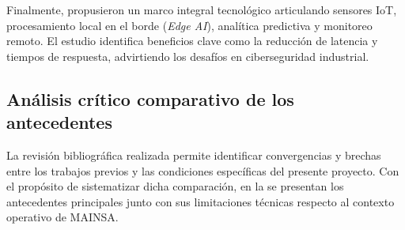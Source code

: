 Finalmente, \cite{hamasha2025} propusieron un marco integral tecnológico articulando sensores IoT, procesamiento local en el borde (\textit{Edge AI}), analítica predictiva y monitoreo remoto. El estudio identifica beneficios clave como la reducción de latencia y tiempos de respuesta, advirtiendo los desafíos en ciberseguridad industrial.

\subsection{Análisis crítico comparativo de los antecedentes}

La revisión bibliográfica realizada permite identificar convergencias y brechas entre los trabajos previos y las condiciones específicas del presente proyecto. Con el propósito de sistematizar dicha comparación, en la  se presentan los antecedentes principales junto con sus limitaciones técnicas respecto al contexto operativo de MAINSA.

